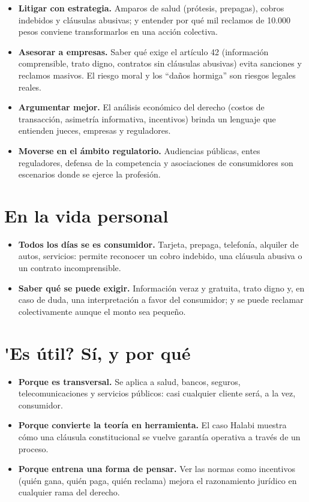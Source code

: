 \documentclass[12pt,oneside]{book}
\begin{document}
\begin{itemize}
\item \textbf{Litigar con estrategia.} Amparos de salud (pr\'otesis, prepagas), cobros indebidos y cl\'ausulas abusivas; y entender por qu\'e mil reclamos de 10.000 pesos conviene transformarlos en una acci\'on colectiva.
\item \textbf{Asesorar a empresas.} Saber qu\'e exige el art\'iculo 42 (informaci\'on comprensible, trato digno, contratos sin cl\'ausulas abusivas) evita sanciones y reclamos masivos. El riesgo moral y los ``da\~nos hormiga'' son riesgos legales reales.
\item \textbf{Argumentar mejor.} El an\'alisis econ\'omico del derecho (costos de transacci\'on, asimetr\'ia informativa, incentivos) brinda un lenguaje que entienden jueces, empresas y reguladores.
\item \textbf{Moverse en el \'ambito regulatorio.} Audiencias p\'ublicas, entes reguladores, defensa de la competencia y asociaciones de consumidores son escenarios donde se ejerce la profesi\'on.
\end{itemize}

\section*{En la vida personal}

\begin{itemize}
\item \textbf{Todos los d\'ias se es consumidor.} Tarjeta, prepaga, telefon\'ia, alquiler de autos, servicios: permite reconocer un cobro indebido, una cl\'ausula abusiva o un contrato incomprensible.
\item \textbf{Saber qu\'e se puede exigir.} Informaci\'on veraz y gratuita, trato digno y, en caso de duda, una interpretaci\'on a favor del consumidor; y se puede reclamar colectivamente aunque el monto sea peque\~no.
\end{itemize}

\section*{\texorpdfstring{\'{}Es \'util? S\'i, y por qu\'e}{Es util? Si, y por que}}

\begin{itemize}
\item \textbf{Porque es transversal.} Se aplica a salud, bancos, seguros, telecomunicaciones y servicios p\'ublicos: casi cualquier cliente ser\'a, a la vez, consumidor.
\item \textbf{Porque convierte la teor\'ia en herramienta.} El caso Halabi muestra c\'omo una cl\'ausula constitucional se vuelve garant\'ia operativa a trav\'es de un proceso.
\item \textbf{Porque entrena una forma de pensar.} Ver las normas como incentivos (qui\'en gana, qui\'en paga, qui\'en reclama) mejora el razonamiento jur\'idico en cualquier rama del derecho.
\end{itemize}
\end{document}
